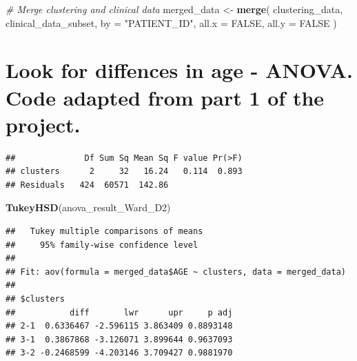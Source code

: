 \documentclass[
]{article}
\newenvironment{Shaded}{\begin{snugshade}}{\end{snugshade}}
\newcommand{\AttributeTok}[1]{\textcolor[rgb]{0.13,0.29,0.53}{#1}}
\newcommand{\CommentTok}[1]{\textcolor[rgb]{0.56,0.35,0.01}{\textit{#1}}}
\newcommand{\ConstantTok}[1]{\textcolor[rgb]{0.56,0.35,0.01}{#1}}
\newcommand{\FunctionTok}[1]{\textcolor[rgb]{0.13,0.29,0.53}{\textbf{#1}}}
\newcommand{\NormalTok}[1]{#1}
\newcommand{\OtherTok}[1]{\textcolor[rgb]{0.56,0.35,0.01}{#1}}
\newcommand{\SpecialCharTok}[1]{\textcolor[rgb]{0.81,0.36,0.00}{\textbf{#1}}}
\newcommand{\StringTok}[1]{\textcolor[rgb]{0.31,0.60,0.02}{#1}}
\begin{document}
\begin{Shaded}
\begin{Highlighting}[]
\CommentTok{\# Merge clustering and clinical data}
\NormalTok{merged\_data }\OtherTok{\textless{}{-}} \FunctionTok{merge}\NormalTok{(}
\NormalTok{  clustering\_data,}
\NormalTok{  clinical\_data\_subset,}
  \AttributeTok{by =} \StringTok{"PATIENT\_ID"}\NormalTok{,}
  \AttributeTok{all.x =} \ConstantTok{FALSE}\NormalTok{,}
  \AttributeTok{all.y =} \ConstantTok{FALSE}
\NormalTok{)}
\end{Highlighting}
\end{Shaded}

\section{Look for diffences in age - ANOVA. Code adapted from part 1 of
the
project.}\label{look-for-diffences-in-age---anova.-code-adapted-from-part-1-of-the-project.}

\begin{Shaded}
\end{Shaded}

\begin{verbatim}
##              Df Sum Sq Mean Sq F value Pr(>F)
## clusters      2     32   16.24   0.114  0.893
## Residuals   424  60571  142.86
\end{verbatim}

\begin{Shaded}
\begin{Highlighting}[]
\FunctionTok{TukeyHSD}\NormalTok{(anova\_result\_Ward\_D2)}
\end{Highlighting}
\end{Shaded}

\begin{verbatim}
##   Tukey multiple comparisons of means
##     95% family-wise confidence level
## 
## Fit: aov(formula = merged_data$AGE ~ clusters, data = merged_data)
## 
## $clusters
##           diff       lwr      upr     p adj
## 2-1  0.6336467 -2.596115 3.863409 0.8893148
## 3-1  0.3867868 -3.126071 3.899644 0.9637093
## 3-2 -0.2468599 -4.203146 3.709427 0.9881970
\end{verbatim}
\end{document}
